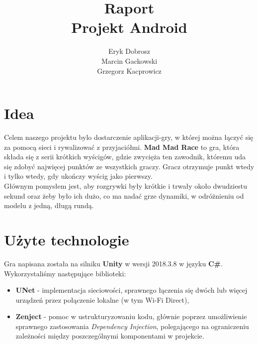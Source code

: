 \documentclass[]{report}
\begin{document}
\title{Raport\\
	\large Projekt Android}
\author{Eryk Dobrosz \\
	Marcin Gackowski \\
	Grzegorz Kacprowicz}

{\let\newpage\relax\maketitle}


\chapter*{Idea}
\quad Celem naszego projektu bylo dostarczenie aplikacji-gry, w której można łączyć się za pomocą sieci i rywalizować z przyjaciółmi. \textbf{Mad Mad Race} to gra, która składa się z serii krótkich wyścigów, gdzie zwycięża ten zawodnik, któremu uda się zdobyć najwięcej punktów ze wszystkich graczy. Gracz otrzymuje punkt wtedy i tylko wtedy, gdy ukończy wyścig jako pierwszy. \\
Głównym pomysłem jest, aby rozgrywki były krótkie i trwały około dwudziestu sekund oraz żeby było ich dużo, co ma nadać grze dynamiki, w odróżnieniu od modelu z jedną, długą rundą.

\chapter*{Użyte technologie}
\quad Gra napisana została na silniku \textbf{Unity} w wersji 2018.3.8 w języku \textbf{C\#}. Wykorzystaliśmy następujące biblioteki:
\begin{itemize}
	\item \textbf{UNet} - implementacja sieciowości, sprawnego łączenia się dwóch lub więcej urządzeń przez połączenie lokalne (w tym Wi-Fi Direct),
	\item \textbf{Zenject} - pomoc w ustrukturyzowaniu kodu, głównie poprzez umożliwienie sprawnego zastosowania \textit{Dependency Injection}, polegającego na ograniczeniu zależności między poszczególnymi komponentami w projekcie.
\end{itemize}
\end{document}
